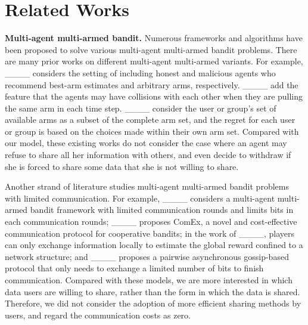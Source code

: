 \section{Related Works}
    \textbf{Multi-agent multi-armed bandit.} Numerous frameworks and algorithms have been proposed to solve various multi-agent multi-armed bandit problems. 
    There are many prior works on different multi-agent multi-armed variants.
    For example, 
    ____ considers the setting of including honest and malicious agents who recommend best-arm estimates and arbitrary arms, respectively. ____ 
    add the feature that the agents may have collisions with each other when they are pulling the same arm in each time step. ____ consider the user or group's set of available arms as a subset of the complete arm set, and the regret for each user or group is based on the choices made within their own arm set.
    Compared with our model, these existing works do not consider the case where an agent may refuse to share all her information with others, and even decide to withdraw if she is forced to share some data that she is not willing to share.
    
    Another strand of literature studies multi-agent multi-armed bandit problems with limited communication. For example, ____ considers a multi-agent multi-armed bandit framework with limited communication rounds and limits bits in each communication rounds; ____ proposes ComEx, a novel and cost-effective communication protocol for cooperative bandits; in the work of ____, players can only exchange information locally to estimate the global reward confined to a network structure; and ____ proposes a pairwise asynchronous gossip-based protocol that only needs to exchange a limited number of bits to finish communication. 
%
Compared with these models, we are more interested in which data users are willing to share, rather than the form in which the data is shared. Therefore, we did not consider the adoption of more efficient sharing methods by users, and regard the communication costs as zero. %

